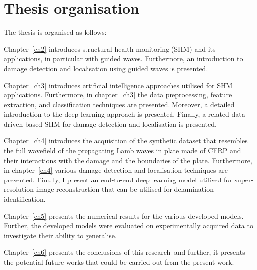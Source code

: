 \section{Thesis organisation}
\label{sec15}
The thesis is organised as follows:

Chapter~\ref{ch2} introduces structural health monitoring (SHM) and its applications, in particular with guided waves.
Furthermore, an introduction to damage detection and localisation using guided waves is presented.

Chapter~\ref{ch3} introduces artificial intelligence approaches utilised for SHM applications.
Furthermore, in chapter~\ref{ch3} the data preprocessing, feature extraction, and classification techniques are presented.
Moreover, a detailed introduction to the deep learning approach is presented.
Finally, a related data-driven based SHM for damage detection and localisation is presented.

Chapter~\ref{ch4} introduces the acquisition of the synthetic dataset that resembles the full wavefield of the propagating Lamb waves in plate made of CFRP and their interactions with the damage and the boundaries of the plate.
Furthermore, in chapter~\ref{ch4} various damage detection and localisation techniques are presented.
Finally, I present an end-to-end deep learning model utilised for super-resolution image reconstruction that can be utilised for delamination identification.

Chapter~\ref{ch5} presents the numerical results for the various developed models.
Further, the developed models were evaluated on experimentally acquired data to investigate their ability to generalise.

Chapter~\ref{ch6} presents the conclusions of this research, and further, it presents the potential future works that could be carried out from the present work.
